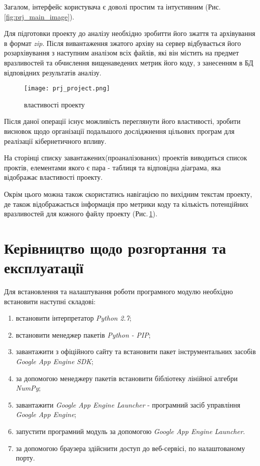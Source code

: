 Загалом, інтерфейс користувача є доволі простим та інтуєтивним (Рис.\,\ref{fig:prj_main_image}).

Для підготовки проекту до аналізу необхідно зробитти його зжаття та архівування в формат {\itshape zip}.
Після вивантаження зжатого архіву на сервер відбувається його розархівування з наступним аналізом всіх файлів, які він містить на предмет вразливостей та обчислення вищенаведених метрик його коду, з занесенням в БД відповідних результатів аналізу.

\begin{figure}[h]
    \centering
    \texttt{[image: prj\_project.png]}
    \caption{властивості проекту}
    \label{fig:prj_project_image}
\end{figure}

Після даної операції існує можливість переглянути його властивості, зробити висновок щодо організації подальшого досліджнення цільових програм для реалізації кібернетичного впливу.

На сторінці списку завантажених(проаналізованих) проектів виводиться список проктів, елементами якого є пара - таблиця та відповідна діаграма, яка відображає властивості проекту.

Окрім цього можна також скористатись навігацією по вихідним текстам проекту, де також відображається інформація про метрики коду та кількість потенційних вразливостей для кожного файлу проекту (Рис.\,\ref{fig:prj_project_image}).

\pagebreak[4]

\section{Керівництво щодо розгортання та експлуатації}
\label{3section:id4}

Для встановлення та налаштування роботи програмного модулю необхідно встановити наступні складові:
\begin{enumerate}
\item встановити інтерпретатор {\it Python 2.7};
\item встановити менеджер пакетів {\it Python - PIP};
\item завантажити з офіційного сайту та встановити пакет інструментальних засобів {\it Google App Engine SDK};
\item за допомогою менеджеру пакетів встановити бібліотеку лінійної алгебри {\it NumPy};
\item завантажити {\it Google App Engine Launcher} - програмний засіб управління {\it Google App Engine};
\item запустити програмний модуль за допомогою {\it Google App Engine Launcher}.
\item за допомогою браузера здійснити доступ до веб-сервісі, по налаштованому порту.
\end{enumerate}

